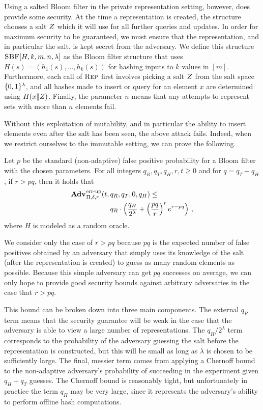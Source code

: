 {Using a salted Bloom filter in the private representation setting, however, does
provide some security. At the time a representation is created, the structure
chooses a salt $Z$ which it will use for all further queries and updates. In
order for maximum security to be guaranteed, we must ensure that the
representation, and in particular the salt, is kept secret from the adversary.
We define this structure $\textnormal{\textsc{SBF}}[H,k,m,n,\lambda]$ as the Bloom filter structure
that uses $H(s) = (h_1(s),\ldots,h_k(s))$ for hashing inputs to $k$ values in
$[m]$. Furthermore, each call of $\textnormal{\textsc{Rep}}$ first involves picking a salt $Z$
from the salt space $\{0,1\}^\lambda$, and all hashes made to insert or query for
an element $x$ are determined using $H(x \Vert Z)$. Finally, the parameter
$n$ means that any attempts to represent sets with more than $n$ elements fail.
}

Without this exploitation of mutability, and in particular the ability to insert
elements even after the salt has been seen, the above attack fails. Indeed, when
we restrict ourselves to the immutable setting, we can prove the following.
%
\begin{theorem}\label{thm:sbf-errep-immutable}
Let $p$ be the standard (non-adaptive) false positive probability for a Bloom
filter with the chosen parameters. For all integers $q_R, q_T, q_H, r, t \geq 0$
and for $q = q_T + q_H$, if $r > pq$, then it holds that
  \begin{equation*}
    \begin{aligned}
            \Adv{\errep}_{\Pi,\delta,r}(t,\,&q_R,q_T,0,q_H) \leq \\
        & q_R \cdot \left(\frac{q_H}{2^\lambda} + \left(\frac{pq}{r}\right)^re^{r-pq}\right) \,,
    \end{aligned}
  \end{equation*}
  where $H$ is modeled as a random oracle.  %
\end{theorem}
We consider only the case of $r > pq$ because $pq$ is the expected number of
false positives obtained by an adversary that simply uses its knowledge of the
salt (after the representation is created) to guess as many random elements as
possible. Because this simple adversary can get $pq$ successes on average, we
can only hope to provide good security bounds against arbitrary adversaries in
the case that $r > pq$.

This bound can be broken down into three main components. The external $q_R$
term means that the security guarantee will be weak in the case that the
adversary is able to view a large number of representations. The $q_H/2^\lambda$
term corresponds to the probability of the adversary guessing the salt before
the representation is constructed, but this will be small as long as $\lambda$
is chosen to be sufficiently large. The final, messier term comes from applying
a Chernoff bound to the non-adaptive adversary's probability of succeeding in
the experiment given $q_H+q_T$ guesses. The Chernoff bound is reasonably tight,
but unfortunately in practice the term $q_H$ may be very large, since it
represents the adversary's ability to perform offline hash computations.

